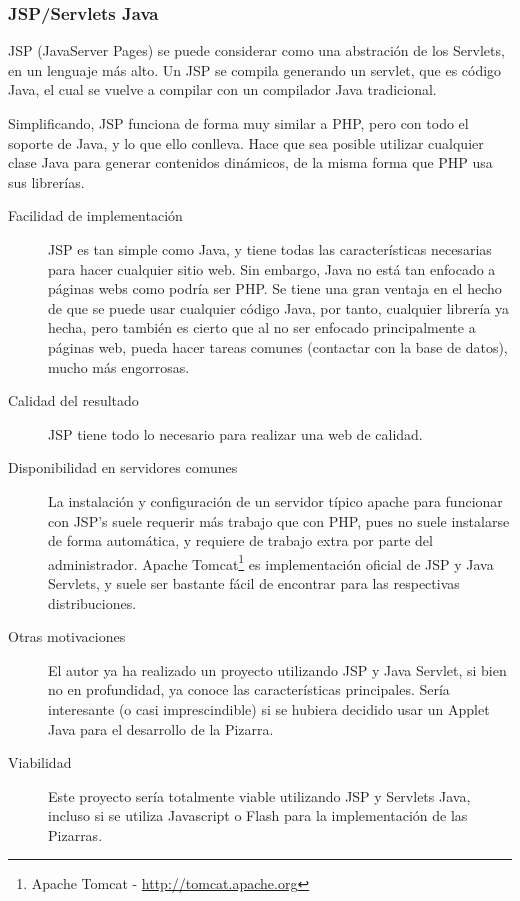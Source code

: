 \subsubsection{JSP/Servlets Java}
JSP (JavaServer Pages) se puede considerar como una abstración de los Servlets, en un lenguaje más alto. Un JSP se compila generando un servlet, que es código Java, el cual se vuelve a compilar con un compilador Java tradicional.

Simplificando, JSP funciona de forma muy similar a PHP, pero con todo el soporte de Java, y lo que ello conlleva. Hace que sea posible utilizar cualquier clase Java para generar contenidos dinámicos, de la misma forma que PHP usa sus librerías.

\begin{description}
	\item[Facilidad de implementación] JSP es tan simple como Java, y tiene todas las características necesarias para hacer cualquier sitio web. Sin embargo, Java no está tan enfocado a páginas webs como podría ser PHP. Se tiene una gran ventaja en el hecho de que se puede usar cualquier código Java, por tanto, cualquier librería ya hecha, pero también es cierto que al no ser enfocado principalmente a páginas web, pueda hacer tareas comunes (contactar con la base de datos), mucho más engorrosas.
	\item[Calidad del resultado] JSP tiene todo lo necesario para realizar una web de calidad.
	\item[Disponibilidad en servidores comunes] La instalación y configuración de un servidor típico apache para funcionar con JSP's suele requerir más trabajo que con PHP, pues no suele instalarse de forma automática, y requiere de trabajo extra por parte del administrador. Apache Tomcat\footnote{Apache Tomcat - \url{http://tomcat.apache.org}} es implementación oficial de JSP y Java Servlets, y suele ser bastante fácil de encontrar para las respectivas distribuciones. 
	\item[Otras motivaciones] El autor ya ha realizado un proyecto utilizando JSP y Java Servlet, si bien no en profundidad, ya conoce las características principales. Sería interesante (o casi imprescindible) si se hubiera decidido usar un Applet Java para el desarrollo de la Pizarra.
	\item[Viabilidad] Este proyecto sería totalmente viable utilizando JSP y Servlets Java, incluso si se utiliza Javascript o Flash para la implementación de las Pizarras.
\end{description}

